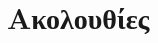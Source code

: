 






\everymath{\displaystyle}

\setlength{\parindent}{0pt}

\pagestyle{vangelis}

% 

\chapter{Ακολουθίες}





